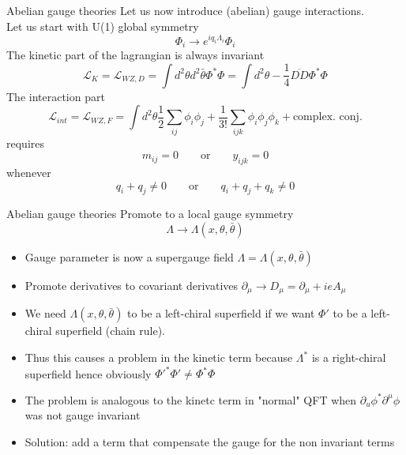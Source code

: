\documentclass[10pt]{beamer}
\begin{document}
\begin{frame}{Abelian gauge theories}
Let us now introduce (abelian) gauge interactions. \\ 
Let us start with U(1) global symmetry 
\begin{equation*}
    \Phi_i \rightarrow e^{iq_i\Lambda_i}\Phi_i
\end{equation*}
The kinetic part of the lagrangian is always invariant
\begin{equation*}
    \mathcal{L}_{K} = \mathcal{L}_{WZ,D} = \int d^2\theta d^2 \bar\theta \Phi^*\Phi = \int d^2\theta -\frac{1}{4} \overline{D D} \Phi^*\Phi
\end{equation*}
The interaction part 
\begin{equation*}
    \mathcal{L}_{int} = \mathcal{L}_{WZ,F} = \int d^2\theta \frac{1}{2} \sum_{ij} \phi_i \phi_j + \frac{1}{3!} \sum_{ijk} \phi_i \phi_j \phi_k + \text{complex. conj.}
\end{equation*}
requires
\begin{equation*}
    m_{ij} = 0 \qquad \text{or} \qquad y_{ijk} = 0
\end{equation*}
whenever
\begin{equation*}
    q_i + q_j \neq 0 \qquad \text{or} \qquad q_i + q_j + q_k \neq 0
\end{equation*}
\end{frame}

\begin{frame}{Abelian gauge theories}
Promote to a local gauge symmetry
\begin{equation*}
    \Lambda \to \Lambda(x, \theta, \bar\theta)
\end{equation*}
\begin{itemize}
    \item Gauge parameter is now a supergauge field $\Lambda = \Lambda(x, \theta, \bar\theta)$
    \item Promote derivatives to covariant derivatives $\partial_\mu \to D_\mu = \partial_\mu + ieA_{\mu}$
    \item We need $\Lambda(x, \theta, \bar\theta)$ to be a left-chiral superfield if we want $\Phi'$ to be a left-chiral superfield (chain rule). \\ 
    \item Thus this causes a problem in the kinetic term because $\Lambda^*$ is a right-chiral superfield
    hence obviously $\Phi'^*\Phi' \neq \Phi^*\Phi$
    \item The problem is analogous to the kinetc term in "normal" QFT when $\partial_u \phi^* \partial^\mu \phi$ was not gauge invariant
    \item Solution: add a term that compensate the gauge for the non invariant terms
\end{itemize}
\end{frame}
\end{document}
